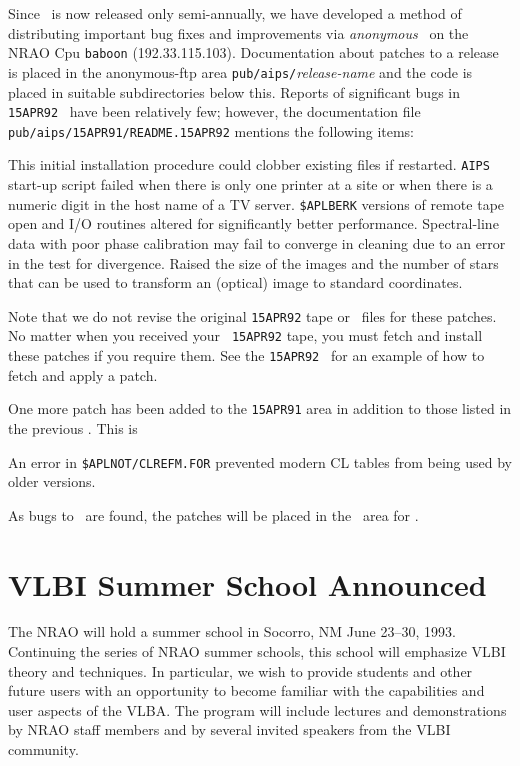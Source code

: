 Since \AIPS\ is now released only semi-annually, we have developed a
method of distributing important bug fixes and improvements via {\it
anonymous} \ftp\ on the NRAO Cpu {\tt baboon} (192.33.115.103).
Documentation about patches to a release is placed in the
anonymous-ftp area {\tt pub/aips/}{\it release-name} and the code is
placed in suitable subdirectories below this.  Reports of significant
bugs in {\tt 15APR92} \AIPS\ have been relatively few; however, the
documentation file {\tt pub/aips/15APR91/README.15APR92} mentions the
following items:
\begin{description}
 This initial installation procedure could clobber
     existing files if restarted.
 \hskip 0.8cm {\tt AIPS} start-up script failed
     when there is only one printer at a site or when there is a
     numeric digit in the host name of a TV server.
 {\tt \$APLBERK} versions of remote tape open and I/O
     routines altered for significantly better performance.
 Spectral-line data with poor phase calibration may fail to
     converge in cleaning due to an error in the test for divergence.
 Raised the size of the images and the number of stars
     that can be used to transform an (optical) image to standard
     coordinates.
\end{description}
Note that we do not revise the original {\tt 15APR92} tape or \tar\
files for these patches.  No matter when you received your {\tt
15APR92} tape, you must fetch and install these patches if you require
them.  See the {\tt 15APR92} \AIPSLETTER\ for an example of how to
fetch and apply a patch.

One more patch has been added to the {\tt 15APR91} area in addition to
those listed in the previous \AIPSLETTER.  This is
\begin{description}
 An error in {\tt \$APLNOT/CLREFM.FOR} prevented modern
     CL tables from being used by older versions.
\end{description}

As bugs to \RELEASENAME\ are found, the patches will be placed in the
\ftp\ area for \RELEASENAME.

\section{VLBI Summer School Announced}

The NRAO will hold a summer school in Socorro, NM June 23--30, 1993.
Continuing the series of NRAO summer schools, this school will
emphasize VLBI theory and techniques.  In particular, we wish to
provide students and other future users with an opportunity to become
familiar with the capabilities and user aspects of the VLBA. The
program will include lectures and demonstrations by NRAO staff members
and by several invited speakers from the VLBI community.

